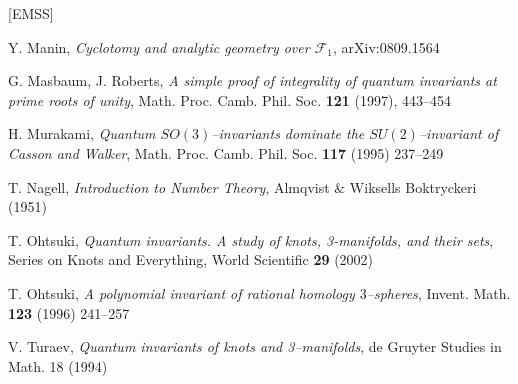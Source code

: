 \documentclass[12pt]{amsart}
\theoremstyle{plain}
\theoremstyle{definition}
\def\F{\mathbb F}
\def\F{\mathcal F}
\begin{document}
\begin{thebibliography}{[EMSS]}



 Y. Manin, {\em Cyclotomy and analytic geometry over $\F_1$},
arXiv:0809.1564

 G. Masbaum, J. Roberts,
{\it A simple proof of integrality of quantum invariants at prime
roots of unity}, Math. Proc. Camb. Phil.  Soc. {\bf 121} (1997),
443--454






  H. Murakami,
{\it Quantum $SO(3)$--invariants dominate the $SU(2)$--invariant of
Casson and Walker}, Math. Proc. Camb. Phil.  Soc. {\bf 117} (1995)
237--249

 T. Nagell, {\it Introduction to Number Theory}, Almqvist \& Wiksells Boktryckeri (1951)

 T. Ohtsuki, {\em Quantum invariants.
A study of knots, 3-manifolds, and their sets}, Series on Knots and
Everything, World Scientific  {\bf 29}
(2002)


 T. Ohtsuki, {\em A polynomial invariant of rational
homology $3$--spheres},  Invent. Math.  {\bf 123}  (1996) 241--257








 V. Turaev, {\em Quantum invariants of knots and
    3--manifolds}, de Gruyter Studies in Math. 18 (1994)


\end{thebibliography}
\end{document}

